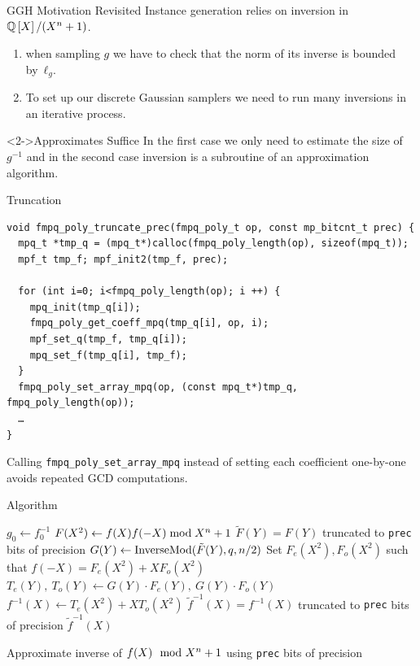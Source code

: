 \documentclass[presentation,smaller]{beamer}
\begin{document}
\begin{frame}[label={sec:orgheadline38}]{GGH Motivation Revisited}
Instance generation relies on inversion in \(\Q[X]/(\cycf)\).

\begin{enumerate}
\item when sampling \(g\) we have to check that the norm of its inverse is bounded by \(ℓ_g\).
\item To set up our discrete Gaussian samplers we need to run many inversions in an iterative process.
\end{enumerate}

\begin{block}<2->{Approximates Suffice}
In the first case we only need to estimate the size of \(g^{-1}\) and in the second case inversion is a subroutine of an approximation algorithm.
\end{block}
\end{frame}

\begin{frame}[fragile,label={sec:orgheadline39}]{Truncation}
 \lstset{language=C,label= ,caption= ,captionpos=b,numbers=none}
\begin{lstlisting}
void fmpq_poly_truncate_prec(fmpq_poly_t op, const mp_bitcnt_t prec) {
  mpq_t *tmp_q = (mpq_t*)calloc(fmpq_poly_length(op), sizeof(mpq_t));
  mpf_t tmp_f; mpf_init2(tmp_f, prec);

  for (int i=0; i<fmpq_poly_length(op); i ++) {
    mpq_init(tmp_q[i]);
    fmpq_poly_get_coeff_mpq(tmp_q[i], op, i);
    mpf_set_q(tmp_f, tmp_q[i]);
    mpq_set_f(tmp_q[i], tmp_f);
  }
  fmpq_poly_set_array_mpq(op, (const mpq_t*)tmp_q, fmpq_poly_length(op));
  …
}
\end{lstlisting}

Calling \texttt{fmpq\_poly\_set\_array\_mpq} instead of setting each coefficient one-by-one avoids repeated GCD computations.
\end{frame}

\begin{frame}[fragile,label={sec:orgheadline40}]{Algorithm}
 \begin{algorithmic}
  \STATE $g_0 \gets f_0^{-1}$
  \ELSE
  \STATE $F(X^2)\gets f(X)f(-X) \bmod X^n+1$
  \STATE $\tilde F(Y) = F(Y)$ \alert{truncated} to {\tt prec} bits of precision
  \STATE $G(Y)\gets \textnormal{InverseMod}(\tilde F(Y),q,n/2)$
  \STATE Set $F_e(X^2), F_o(X^2)$ such that $f(-X) = F_e(X^2)+X F_o(X^2)$
  \STATE $T_e(Y),\ T_o(Y) \gets G(Y)· F_e(Y),\ G(Y)· F_o(Y)$
  \STATE $f^{-1}(X)\gets T_e(X^2) + X T_o(X^2)$
  \STATE $\tilde f^{-1}(X) = f^{-1}(X)$ \alert{truncated} to {\tt prec} bits of precision
  \RETURN $\tilde f^{-1}(X)$
  \ENDIF
\end{algorithmic}

Approximate inverse of \(f(X) \mod {X^n+1}\) using \texttt{prec} bits of precision
\end{frame}
\end{document}
